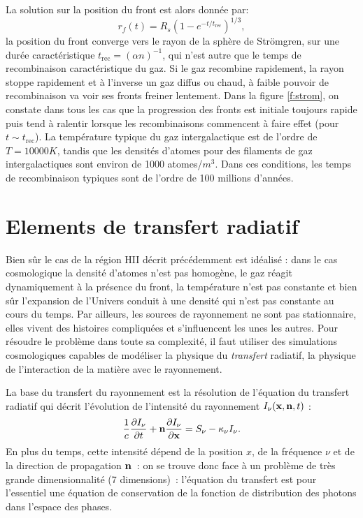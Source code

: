 La solution sur la position du front  est alors donnée par:
\begin{equation}
r_f(t)=R_s(1-e^{-t/t_\mathrm{rec}})^{1/3},
\end{equation}
la position du front converge vers le rayon de la sphère de Strömgren, sur une durée caractéristique $t_\mathrm{rec}=(\alpha n)^{-1}$, qui n'est autre que le temps de recombinaison caractéristique du gaz. Si le gaz recombine rapidement, la rayon stoppe rapidement et à l'inverse un gaz diffus ou chaud, à faible pouvoir de recombinaison va voir ses fronts freiner lentement. Dans la figure \ref{f:strom}, on constate dans tous les cas que la progression des fronts est initiale toujours rapide puis tend à ralentir lorsque les recombinaisons commencent à faire effet (pour $t\sim t_\mathrm{rec}$). La température typique du gaz intergalactique est de l'ordre de $T=10 000 K$, tandis que les densités d'atomes pour des filaments de gaz intergalactiques sont environ de 1000 atomes/$m^3$. Dans ces conditions, les temps de recombinaison typiques sont de l'ordre de 100 millions d'années.

\section{Elements de transfert radiatif}

Bien sûr le cas de la région HII décrit précédemment est idéalisé : dans le cas cosmologique la densité d'atomes n'est pas homogène, le gaz réagit dynamiquement à la présence du front, la température n'est pas constante et bien sûr l'expansion de l'Univers conduit à une densité qui n'est pas constante au cours du temps. Par ailleurs, les sources de rayonnement ne sont pas stationnaire, elles vivent des histoires compliquées et s'influencent les unes les autres. Pour résoudre le problème dans toute sa complexité, il faut utiliser des simulations cosmologiques capables de modéliser la physique du \textit{transfert} radiatif, la physique de l'interaction de la matière avec le rayonnement. 

La base du transfert du rayonnement est la résolution de l'équation du transfert radiatif qui décrit l'évolution de l'intensité du rayonnement $I_\nu({\bf x},{\bf n} ,t)$ :
\begin{equation}
\frac{1}{c}\frac{\partial I_\nu}{\partial t}+{\bf n} \frac{\partial I_\nu}{\partial {\bf x}}=S_\nu - \kappa_\nu I_\nu.
\end{equation}
En plus du temps, cette intensité dépend de la position $x$, de la fréquence $\nu$ et de la direction de propagation $\bf n$~: on se trouve donc face à un problème de très grande dimensionnalité (7 dimensions)~: l'équation du transfert est pour l'essentiel une équation de conservation de la fonction de distribution des photons dans l'espace des phases.

